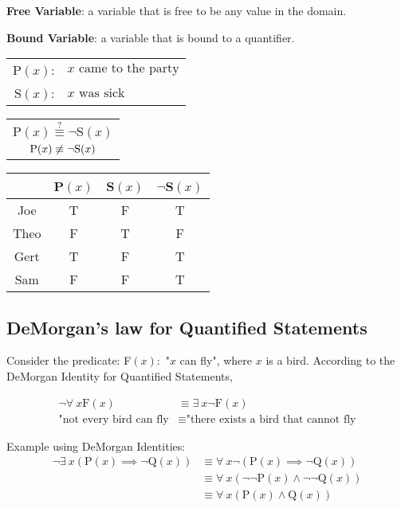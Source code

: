 \noindent \textbf{Free Variable}: a variable that is free to be any value in the domain.

\noindent \textbf{Bound Variable}: a variable that is bound to a quantifier.

\begin{center}
  \begin{tabular}{rl}
    $\text{P}(x)$: & $x \text{ came to the party}$ \\
    $\text{S}(x)$: & $x \text{ was sick}$          \\
  \end{tabular}
  \qquad
  \begin{tabular}{c}
    $\text{P}(x) \overset{?}{\equiv} \lnot \text{S}(x)$ \\
    $\text{P}(x) \centernot{\equiv} \lnot \text{S}(x)$
  \end{tabular}
  \qquad
  \begin{tabular}{c|ccc}
         & P$(x)$ & S$(x)$ & $\lnot$S$(x)$ \\
    \hline
    Joe  & T      & F      & T             \\
    Theo & F      & T      & F             \\
    Gert & T      & F      & T             \\
    Sam  & F      & F      & T
  \end{tabular}
\end{center}

\subsection{DeMorgan's law for Quantified Statements}


Consider the predicate: F$(x):$ "$x$ can fly", where $x$ is a bird.
According to the DeMorgan Identity for Quantified Statements,

\begin{align*}
  \lnot \forall~ x \text{F}(x)    & \equiv \exists~ x \lnot \text{F}(x)                 \\
  \text{"not every bird can fly} & \equiv \text{"there exists a bird that cannot fly}
\end{align*}

Example using DeMorgan Identities:
\begin{align*}
  \lnot \exists~ x (\text{P}(x) \implies \lnot \text{Q}(x)) & \equiv \forall~ x \lnot (\text{P}(x) \implies \lnot \text{Q}(x))          \\
                                                           & \equiv \forall~ x (\lnot \lnot \text{P}(x) \land \lnot \lnot \text{Q}(x)) \\
                                                           & \equiv \forall~ x (\text{P}(x) \land \text{Q}(x))
\end{align*}

